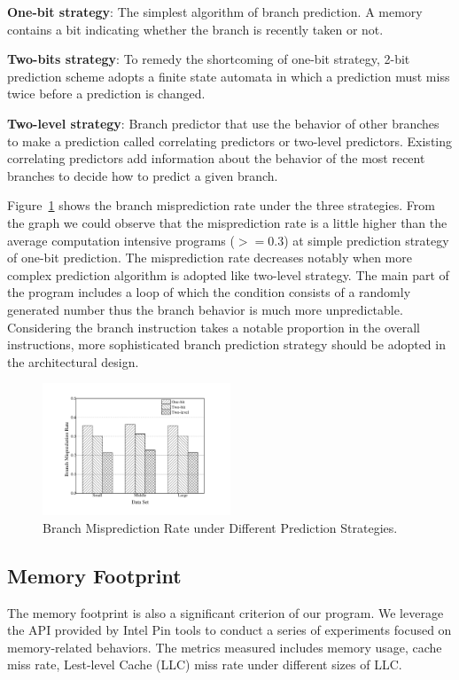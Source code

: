 \begin{compactitem}
\item \textbf{One-bit strategy}: The simplest algorithm of branch prediction. A memory contains a bit indicating whether the branch is recently taken or not.
\item \textbf{Two-bits strategy}: To remedy the shortcoming of one-bit strategy, 2-bit prediction scheme adopts a finite state automata in which a prediction must miss twice before a prediction is changed.
\item \textbf{Two-level strategy}: Branch predictor that use the behavior of other branches to make a prediction called correlating predictors or two-level predictors. Existing correlating predictors add information about the behavior of the most recent branches to decide how to predict a given branch.
\end{compactitem}
Figure~\ref{fig:predict} shows the branch misprediction rate under the three strategies. From the graph we could observe that the misprediction rate is a little higher than the average computation intensive programs ($>=0.3$) at simple prediction strategy of one-bit prediction. The misprediction rate decreases notably when more complex prediction algorithm is adopted like two-level strategy. The main part of the program includes a loop of which the condition consists of a randomly generated number thus the branch behavior is much more unpredictable. Considering the branch instruction takes a notable proportion in the overall instructions, more sophisticated branch prediction strategy should be adopted in the architectural design. 

\begin{figure}
\centering
\includegraphics[width=0.50\textwidth]{graph/predict.pdf}
\caption{Branch Misprediction Rate under Different Prediction Strategies.}
\label{fig:predict}
\end{figure}

\subsection{Memory Footprint}
\label{sec:memory}
The memory footprint is also a significant criterion of our program. We leverage the API provided by Intel Pin tools to conduct a series of experiments focused on memory-related behaviors. The metrics measured includes memory usage, cache miss rate, Lest-level Cache (LLC) miss rate under different sizes of LLC.

